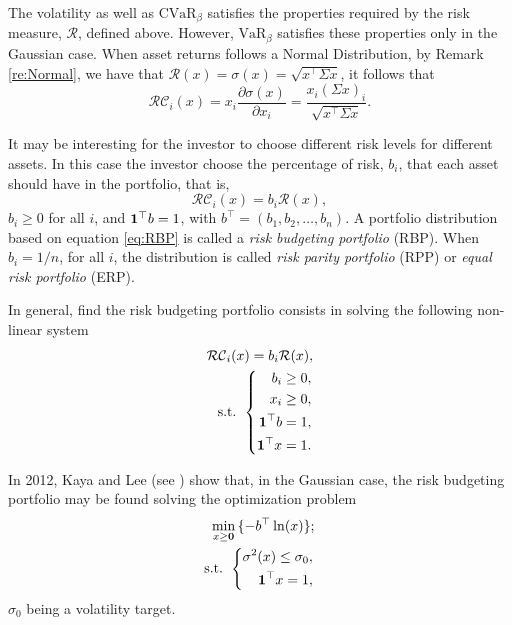 The volatility as well as $\mbox{CVaR}_\beta$  satisfies the properties required by the risk measure, $\mathcal{R}$, defined above. However, $\mbox{VaR}_\beta$ satisfies these properties only in the Gaussian case. When asset returns follows a Normal Distribution, by Remark \ref{re:Normal}, we have that
$\mathcal{R}(x)=\sigma(x)=\sqrt{x^\top\Sigma x}$, it follows that
\[
	\mathcal{RC}_i(x)= x_i \frac{\partial \sigma(x)}{\partial x_i}=\frac{x_i (\Sigma x)_i}{\sqrt{x^\top\Sigma x }}.
\]

It may be interesting for the investor to choose different risk levels for different assets. In this case the investor choose the percentage of risk, $b_i$, that each asset should have in the portfolio, that is,
\begin{equation}\label{eq:RBP}
	\mathcal{RC}_i(x)=b_i\mathcal{R}(x),
\end{equation}
$b_i\geq 0$ for all $i$, and
${\bf 1}^\top b =1$, with $b^\top=(b_1, b_2, \dots, b_n)$. A portfolio distribution based on equation \eqref{eq:RBP} is called a \textit{risk budgeting portfolio} (RBP). When $b_i=1/n$, for all $i$, the distribution is called \textit{risk parity portfolio} (RPP) or \textit{equal risk portfolio} (ERP).

In general, find the risk budgeting portfolio consists in solving the following non-linear system
\begin{eqnarray*}
	\mathcal{RC}_i(x)=b_i\mathcal{R}(x), \\
	\mbox{s.t. }\left\{
	\begin{aligned}\nonumber
		b_i \geq 0,        \\
		x_i \geq 0,        \\
		{\bf 1}^\top b =1, \\
		{\bf 1}^\top x =1.
	\end{aligned}
	\right.
\end{eqnarray*}

In 2012, Kaya and Lee (see \cite{KayaLee2012}) show that, in the Gaussian case, the risk budgeting portfolio may be found solving the optimization problem
\begin{eqnarray}
	\min_{x\geq \textbf{0}}\, \{-b^\top \ln(x)\}; \label{eq:RPP}\\
	\mbox{s.t. }\left\{ \nonumber
	\begin{aligned}\nonumber
		\sigma^2(x)\leq \sigma_0, \\
		{\bf 1}^\top x =1,
	\end{aligned}
	\right.
\end{eqnarray}
$\sigma_0$ being a volatility target.


